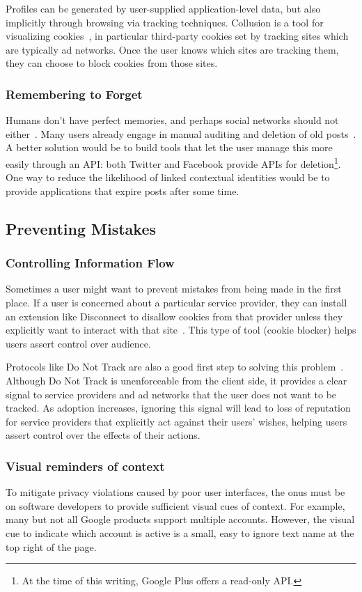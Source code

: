 \documentclass[10pt, conference, compsocconf]{IEEEtran}
\begin{document}
Profiles can be generated by user-supplied application-level data, but also
implicitly through browsing via tracking techniques.
Collusion is a tool for visualizing cookies~\cite{collusion}, in particular
third-party cookies set by tracking sites which are typically ad networks.
Once the user knows which sites are tracking them, they can choose to block
cookies from those sites.

\subsubsection{Remembering to Forget}
Humans don't have perfect memories, and perhaps social networks should not
either~\cite{delete}. Many users already engage in manual auditing and deletion
of old posts~\cite{fbtips2}. A better solution would be to build tools that let
the user manage this more easily through an API: both Twitter and Facebook
provide APIs for deletion\footnote{At the time of this writing, Google Plus
offers a read-only API.}. One way to reduce the likelihood of linked contextual
identities would be to provide applications that expire posts after some time.

\subsection{Preventing Mistakes}
\subsubsection{Controlling Information Flow}
Sometimes a user might want to prevent mistakes from being made in the first
place. If a user is concerned about a particular service provider, they can
install an extension like Disconnect to disallow cookies from that provider
unless they explicitly want to interact with that site~\cite{disconnect}.
This type of tool (cookie blocker) helps users assert control over audience.

Protocols like Do Not Track are also a good first step to solving this
problem~\cite{dnt}. Although Do Not Track is unenforceable from the client
side, it provides a clear signal to service providers and ad networks that the
user does not want to be tracked. As adoption increases, ignoring this signal
will lead to loss of reputation for service providers that explicitly act
against their users' wishes, helping users assert control over the effects of
their actions.

\subsubsection{Visual reminders of context}
To mitigate privacy violations caused by poor user interfaces, the onus must be
on software developers to provide sufficient visual cues of context. For
example, many but not all Google products support multiple accounts. However,
the visual cue to indicate which account is active is a small, easy to ignore
text name at the top right of the page.
\end{document}
